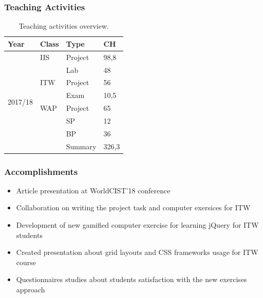 \documentclass[10pt,xcolor=pdflatex]{beamer}
\begin{document}
 \begin{frame}\frametitle{Teaching Activities}
     \begin{table}[]
     \centering    
     \label{my-label}     
     \begin{tabular}{|l|l|l|l|}
     \hline
     Year                       & Class                & Type    & CH \\ \hline
        \multirow{8}{*}{2017/18} & IIS                 & Project & 98,8  \\ \cline{2-4} 
                                & \multirow{3}{*}{ITW} & Lab     & 48  \\ \cline{3-4} 
                                &                      & Project & 56  \\ \cline{3-4}
                                &                      & Exam    & 10,5  \\ \cline{2-4}
                                & WAP                  & Project & 65  \\ \cline{2-4} 
                                & \multirow{2}{*}{}    & SP      & 12  \\ \cline{3-4} 
                                &                      & BP      & 36  \\ \cline{1-4} 
                                &                      & Summary & 326,3  \\ \hline
     \end{tabular}      
     \caption{Teaching activities overview.}
     \end{table}
 \end{frame}
 

 \begin{frame}\frametitle{Accomplishments}
     \begin{itemize}
         \item Article presentation at WorldCIST'18 conference
         \item Collaboration on writing the project task and computer exersices for ITW
         \item Development of new gamified computer exercise for learning jQuery for ITW students
         \item Created presentation about grid layouts and CSS frameworks usage for ITW course
         \item Questionnaires studies about students satisfaction with the new exercises approach
     \end{itemize}
 \end{frame}
 
\end{document}
